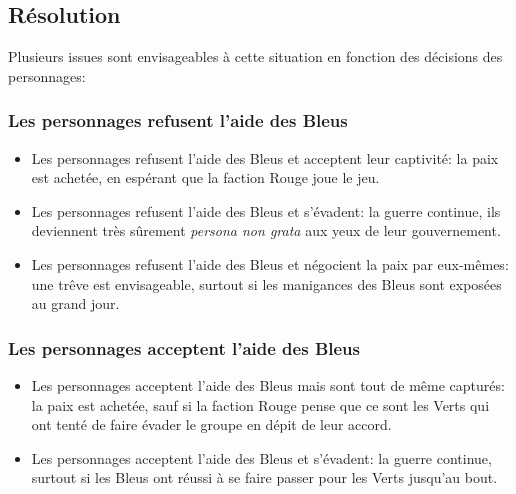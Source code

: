 \subsection{Résolution}

Plusieurs issues sont envisageables à cette situation en fonction des décisions des personnages:

\subsubsection{Les personnages refusent l'aide des Bleus}
\begin{itemize}
	\item Les personnages refusent l'aide des Bleus et acceptent leur captivité: la paix est achetée, en espérant que la faction Rouge joue le jeu.
	\item Les personnages refusent l'aide des Bleus et s'évadent: la guerre continue, ils deviennent très sûrement \emph{persona non grata} aux yeux de leur gouvernement.
	\item Les personnages refusent l'aide des Bleus et négocient la paix par eux-mêmes: une trêve est envisageable, surtout si les manigances des Bleus sont exposées au grand jour.
\end{itemize}

\subsubsection{Les personnages acceptent l'aide des Bleus}
\begin{itemize}
	\item Les personnages acceptent l'aide des Bleus mais sont tout de même capturés: la paix est achetée, sauf si la faction Rouge pense que ce sont les Verts qui ont tenté de faire évader le groupe en dépit de leur accord.
	\item Les personnages acceptent l'aide des Bleus et s'évadent: la guerre continue, surtout si les Bleus ont réussi à se faire passer pour les Verts jusqu'au bout.
\end{itemize}

